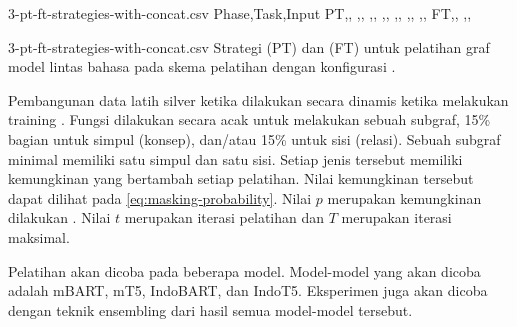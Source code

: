 \begin{filecontents*}{3-pt-ft-strategies-with-concat.csv}
Phase,Task,Input
PT,,\makecell[cl]{\idTagged{[mask]}\enTagged{[mask]}\graphMasked{}}
,,
,,
,,
,,
,,
,,
FT,,
,,
\end{filecontents*}
  {3-pt-ft-strategies-with-concat.csv}
  {Strategi \pretraining{} (PT) dan \finetuning{} (FT) untuk pelatihan graf model \amrparsing{} lintas bahasa pada skema pelatihan  dengan konfigurasi .}

Pembangunan data latih silver ketika \pretraining{} dilakukan  secara dinamis ketika melakukan training .
Fungsi  dilakukan secara acak untuk melakukan  sebuah subgraf, 15\% bagian untuk  simpul (konsep), dan/atau 15\% untuk  sisi (relasi).
Sebuah subgraf minimal memiliki satu simpul dan satu sisi.
Setiap jenis  tersebut memiliki kemungkinan yang bertambah setiap  pelatihan.
Nilai kemungkinan tersebut dapat dilihat pada \cref{eq:masking-probability}.
Nilai $p$ merupakan kemungkinan dilakukan .
Nilai $t$ merupakan iterasi pelatihan dan $T$ merupakan iterasi maksimal.


Pelatihan \amrparsing{} akan dicoba pada beberapa \multil{} model.
Model-model yang akan dicoba adalah mBART, mT5, IndoBART, dan IndoT5.
Eksperimen \amrparsing{} juga akan dicoba dengan teknik \AMR{} ensembling  dari hasil semua model-model tersebut.

